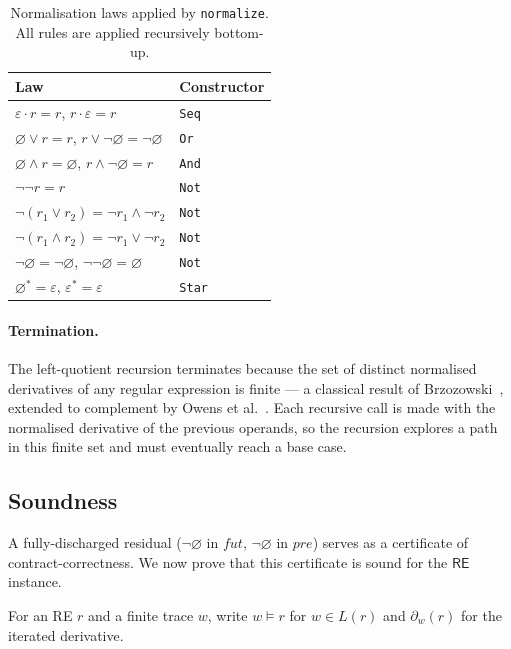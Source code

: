 \documentclass[acmsmall,screen]{acmart}
\newcommand{\RE}{\mathsf{RE}}
\newcommand{\pre}{\mathit{pre}}
\newcommand{\fut}{\mathit{fut}}
\newcommand{\univ}{\neg\varnothing}
\begin{document}
\begin{table}[ht]
\caption{Normalisation laws applied by \lstinline{normalize}.
         All rules are applied recursively bottom-up.}
\label{tab:normalize-laws}
\begin{tabular}{ll}
\toprule
Law & Constructor \\
\midrule
$\varepsilon \cdot r = r$, $r \cdot \varepsilon = r$ & \lstinline{Seq} \\
$\varnothing \vee r = r$, $r \vee \univ = \univ$ & \lstinline{Or} \\
$\varnothing \wedge r = \varnothing$, $r \wedge \univ = r$ & \lstinline{And} \\
$\neg\neg r = r$ & \lstinline{Not} \\
$\neg(r_1\vee r_2) = \neg r_1\wedge\neg r_2$ & \lstinline{Not} \\
$\neg(r_1\wedge r_2) = \neg r_1\vee\neg r_2$ & \lstinline{Not} \\
$\neg\varnothing = \univ$, $\neg\univ = \varnothing$ & \lstinline{Not} \\
$\varnothing^* = \varepsilon$, $\varepsilon^* = \varepsilon$ & \lstinline{Star} \\
\bottomrule
\end{tabular}
\end{table}

\paragraph{Termination.}
The left-quotient recursion terminates because the set of distinct
normalised derivatives of any regular expression is finite --- a classical
result of Brzozowski~\cite{brzozowski1964}, extended to complement by
Owens et al.~\cite{owens2009}.
Each recursive call is made with the normalised derivative of the previous
operands, so the recursion explores a path in this finite set and must
eventually reach a base case.

\subsection{Soundness}
\label{sec:soundness}

A fully-discharged residual ($\univ$ in $\fut$, $\univ$ in $\pre$) serves as
a certificate of contract-correctness.
We now prove that this certificate is sound for the $\RE$ instance.

For an RE $r$ and a finite trace $w$, write $w \models r$ for $w \in L(r)$
and $\partial_w(r)$ for the iterated derivative.
\end{document}
